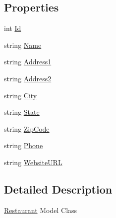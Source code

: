 \subsection*{Properties}
\begin{DoxyCompactItemize}
\item 
int \hyperlink{class_restaurant_reviews_1_1_data_1_1_restaurant_af9e553e8333052a70568eba1f252472f}{Id}
\item 
string \hyperlink{class_restaurant_reviews_1_1_data_1_1_restaurant_a62f3063f97c6d6248f0c24463381960a}{Name}
\item 
string \hyperlink{class_restaurant_reviews_1_1_data_1_1_restaurant_a0176470b07433377f534ae374dedf6b9}{Address1}
\item 
string \hyperlink{class_restaurant_reviews_1_1_data_1_1_restaurant_a83e5d2091ed578a0fc47b9b89a2402f3}{Address2}
\item 
string \hyperlink{class_restaurant_reviews_1_1_data_1_1_restaurant_a9186d3064bc2da5e4916b34dbf2c55af}{City}
\item 
string \hyperlink{class_restaurant_reviews_1_1_data_1_1_restaurant_a4291187587c0b71fb0b0bd86b6accf00}{State}
\item 
string \hyperlink{class_restaurant_reviews_1_1_data_1_1_restaurant_a96e74386625c8b6568b3af124ff6b189}{Zip\+Code}
\item 
string \hyperlink{class_restaurant_reviews_1_1_data_1_1_restaurant_a749774806dbe96c87fa4c53731f1960f}{Phone}
\item 
string \hyperlink{class_restaurant_reviews_1_1_data_1_1_restaurant_a35b157e2ae4d789b591ad0f144b7f883}{Website\+U\+RL}
\end{DoxyCompactItemize}


\subsection{Detailed Description}
\hyperlink{class_restaurant_reviews_1_1_data_1_1_restaurant}{Restaurant} Model Class 



